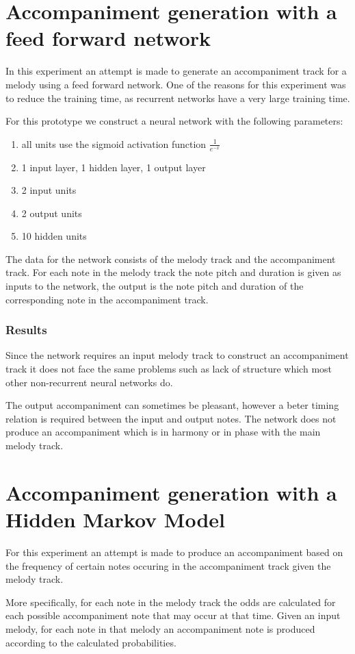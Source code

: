 \chapter{Accompaniment generation with a feed forward network}
In this experiment an attempt is made to generate an accompaniment track for a melody using a feed forward network. One of the reasons for this experiment was to reduce the training time, as recurrent networks have a very large training time.

For this prototype we construct a neural network with the following parameters:
\begin{enumerate}
\item all units use the sigmoid activation function $\frac{1}{e^{-x}}$
\item 1 input layer, 1 hidden layer, 1 output layer
\item 2 input units
\item 2 output units
\item 10 hidden units
\end{enumerate}

The data for the network consists of the melody track and the accompaniment track. For each note in the melody track the note pitch and duration is given as inputs to the network, the output is the note pitch and duration of the corresponding note in the accompaniment track.

\subsection{Results}
Since the network requires an input melody track to construct an accompaniment track it does not face the same problems such as lack of structure which most other non-recurrent neural networks do.

The output accompaniment can sometimes be pleasant, however a beter timing relation is required between the input and output notes. The network does not produce an accompaniment which is in harmony or in phase with the main melody track.

\chapter{Accompaniment generation with a Hidden Markov Model}
For this experiment an attempt is made to produce an accompaniment based on the frequency of certain notes occuring in the accompaniment track given the melody track.

More specifically, for each note in the melody track the odds are calculated for each possible accompaniment note that may occur at that time. Given an input melody, for each note in that melody an accompaniment note is produced according to the calculated probabilities.


